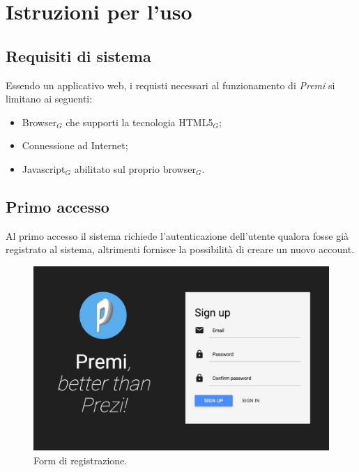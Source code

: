 \section{Istruzioni per l'uso}
\subsection{Requisiti di sistema}
Essendo un applicativo web, i requisti necessari al funzionamento di \emph{Premi} si limitano ai seguenti:
\begin{itemize}
\item Browser$_G$ che supporti la tecnologia HTML5$_G$;
\item Connessione ad Internet;
\item Javascript$_G$ abilitato sul proprio browser$_G$.
\end{itemize}


\subsection{Primo accesso}
Al primo accesso il sistema richiede l'autenticazione dell'utente qualora fosse già registrato al sistema, altrimenti fornisce la possibilità di creare un nuovo account.
\begin{figure}[h]
\begin{center}
\includegraphics[scale=0.4]{img/signup.png}
\caption{Form di registrazione.}
\end{center}
\end{figure}

